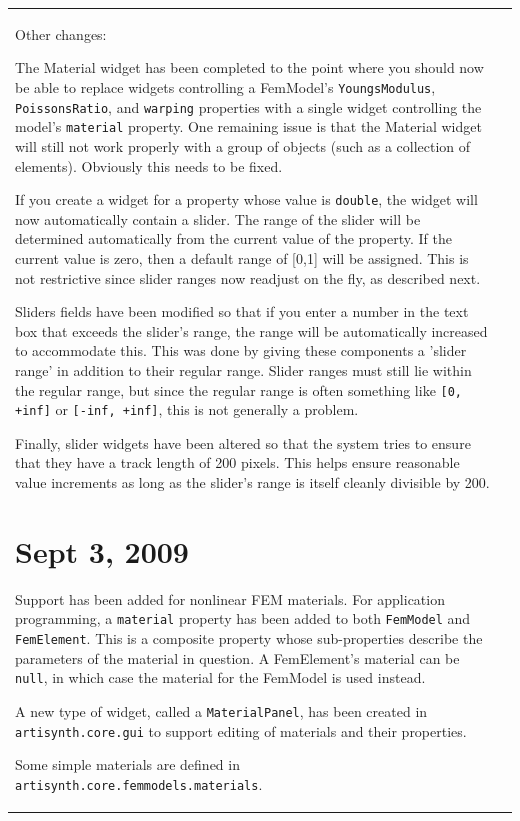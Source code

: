 \documentclass{article}
\begin{document}
\begin{tabular}{ll}
Other changes:

The Material widget has been completed to the point where you should
now be able to replace widgets controlling a FemModel's
{\tt YoungsModulus}, {\tt PoissonsRatio}, and {\tt warping} properties with a
single widget controlling the model's {\tt material} property. One
remaining issue is that the Material widget will still not work
properly with a group of objects (such as a collection of
elements). Obviously this needs to be fixed.

If you create a widget for a property whose value is {\tt double}, the
widget will now automatically contain a slider. The range of the
slider will be determined automatically from the current value of the
property. If the current value is zero, then a default range of [0,1]
will be assigned. This is not restrictive since slider ranges now
readjust on the fly, as described next.

Sliders fields have been modified so that if you enter a number in the
text box that exceeds the slider's range, the range will be
automatically increased to accommodate this. This was done by giving
these components a 'slider range' in addition to their regular
range. Slider ranges must still lie within the regular range, but
since the regular range is often something like {\tt [0, +inf]} or 
{\tt [-inf, +inf]}, this is not generally a problem.

Finally, slider widgets have been altered so that the system tries to
ensure that they have a track length of 200 pixels.  This helps ensure
reasonable value increments as long as the slider's range is itself
cleanly divisible by 200.

\section*{Sept 3, 2009}

Support has been added for nonlinear FEM materials. For application
programming, a {\tt material} property has been added to both {\tt FemModel}
and {\tt FemElement}. This is a composite property whose sub-properties
describe the parameters of the material in question. A FemElement's
material can be {\tt null}, in which case the material for the FemModel is
used instead.

A new type of widget, called a {\tt MaterialPanel}, has been created in
{\tt artisynth.core.gui} to support editing of materials and their
properties.

Some simple materials are defined in
{\tt artisynth.core.femmodels.materials}.


\end{tabular}
\end{document}
